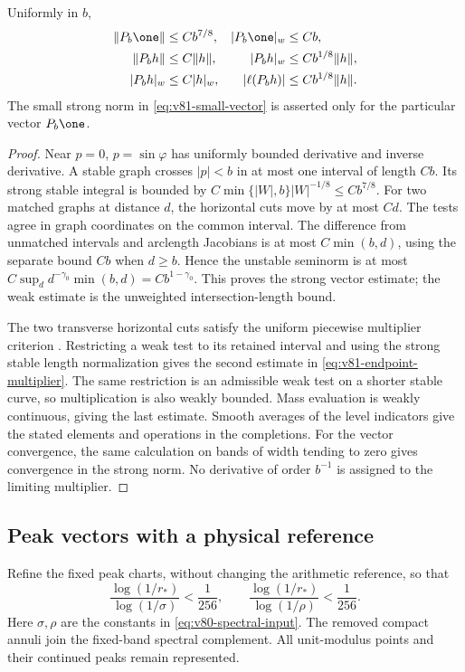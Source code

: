 \begin{lemma}
\label{lem:v81-endpoint-vector}
Uniformly in $b$,
\begin{align}
 \|P_b\one\|&\le Cb^{7/8},& |P_b\one|_w&\le Cb,
                                             \label{eq:v81-small-vector}\\
 \|P_bh\|&\le C\|h\|,& |P_bh|_w&\le Cb^{1/8}\|h\|,
                                             \label{eq:v81-endpoint-multiplier}\\
 |P_bh|_w&\le C|h|_w,& |\ell(P_bh)|&\le Cb^{1/8}\|h\|.
                                             \label{eq:v81-terminal-small}
\end{align}
The small strong norm in \eqref{eq:v81-small-vector} is asserted
only for the particular vector $P_b\one$.
\end{lemma}
\begin{proof}
Near $p=0$, $p=\sin\varphi$ has uniformly bounded derivative and
inverse derivative. A stable graph crosses $|p|<b$ in at most one
interval of length $Cb$. Its strong stable integral is bounded by
$C\min\{|W|,b\}|W|^{-1/8}\le Cb^{7/8}$.
For two matched graphs at distance $d$, the horizontal cuts move by
at most $Cd$. The tests agree in graph coordinates on the common
interval. The difference from unmatched intervals and arclength
Jacobians is at most $C\min(b,d)$, using the separate bound $Cb$
when $d\ge b$. Hence the unstable seminorm is at most
$C\sup_d d^{-\gamma_0}\min(b,d)=Cb^{1-\gamma_0}$.
This proves the strong vector estimate; the weak estimate is the
unweighted intersection-length bound.

The two transverse horizontal cuts satisfy the uniform piecewise
multiplier criterion \cite[Lemma 3.3(b)]{DPZ}. Restricting a weak
test to its retained interval and using the strong stable length
normalization gives the second estimate in
\eqref{eq:v81-endpoint-multiplier}. The same restriction is an
admissible weak test on a shorter stable curve, so multiplication
is also weakly bounded. Mass evaluation is weakly continuous, giving
the last estimate. Smooth averages of the level indicators give
the stated elements and operations in the completions. For the
vector convergence, the same calculation on bands of width tending
to zero gives convergence in the strong norm. No derivative of order
$b^{-1}$ is assigned to the limiting multiplier.
\end{proof}

\subsection{Peak vectors with a physical reference}
Refine the fixed peak charts, without changing the arithmetic
reference, so that
\begin{equation}\label{eq:v81-peak-refinement}
 \frac{\log(1/r_*)}{\log(1/\sigma)}<\frac1{256},\qquad
 \frac{\log(1/r_*)}{\log(1/\rho)}<\frac1{256}.
\end{equation}
Here $\sigma,\rho$ are the constants in
\eqref{eq:v80-spectral-input}. The removed compact annuli join the
fixed-band spectral complement. All unit-modulus points and their
continued peaks remain represented.

